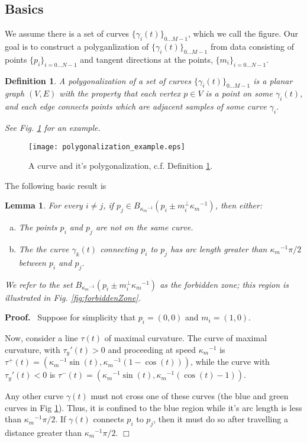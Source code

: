 \documentclass{article}
\newtheorem{definition}[cntr]{Definition}
\newenvironment{proof}{
  \noindent\textbf{Proof.}\ }{\hspace*{\fill}
  \begin{math}\Box\end{math}\medskip}
\newtheorem{lemma}[cntr]{Lemma}
\numberwithin{cntr}{section}
\numberwithin{equation}{section}
\newcommand{\Oto}[1]{{0 \ldots #1-1}}
\newcommand{\OtoN}{{0 \ldots N-1}}
\newcommand{\pointData}{{ \{ p_{i} \}_{i=\OtoN} }}
\newcommand{\tanData}{{ \{ m_{i} \}_{i=\OtoN} }}
\newcommand{\curveSet}{{ \{ \gamma_i(t) \}_{\Oto{M}}}}
\newcommand{\ball}[2]{ { B_{#1}(#2) } }
\newcommand{\kmax}{{\kappa_{m}}}
\newcommand{\kmaxi}{{\kmax^{-1}}}
\begin{document}
\subsection{Basics}

We assume there is a set of curves $\curveSet$, which we call the figure. Our goal is to construct a polyganlization of $\curveSet$ from data consisting of points $\pointData$ and tangent directions at the points, $\tanData$.

\begin{definition}
  \label{def:polygonalization}
  A polygonalization of a set of curves $\curveSet$ is a planar graph $(V,E)$ with the property that each vertex $p \in V$ is a point on some $\gamma_{i}(t)$, and each edge connects points which are adjacent samples of some curve $\gamma_{i}$.

  See Fig. \ref{fig:polygonalization} for an example.
\end{definition}

\begin{figure}
\setlength{\unitlength}{0.240900pt}
\ifx\plotpoint\undefined\newsavebox{\plotpoint}\fi
\sbox{\plotpoint}{\rule[-0.200pt]{0.400pt}{0.400pt}}%
\texttt{[image: polygonalization\_example.eps]}

\caption{A curve and it's polygonalization, c.f. Definition \ref{def:polygonalization}. }
\label{fig:polygonalization}
\end{figure}

The following basic result is
\begin{lemma}
  \label{lem:forbiddenZone}
  For every $i \neq j$, if $p_{j} \in \ball{\kmaxi}{p_{i} \pm m_{i}^{\perp} \kmaxi}$, then either:
  \begin{enumerate}[a.]
  \item The points $p_{i}$ and $p_{j}$ are not on the same curve.
  \item The the curve $\gamma_{k}(t)$ connecting $p_{i}$ to $p_{j}$ has arc length greater than $\kmaxi \pi/2$ between $p_{i}$ and $p_{j}$.
  \end{enumerate}
  We refer to the set $\ball{\kmaxi}{p_{i} \pm m_{i}^{\perp} \kmaxi}$ as the \emph{forbidden zone}; this region is illustrated in Fig. \ref{fig:forbiddenZone}.
\end{lemma}

\begin{proof}
  Suppose for simplicity that $p_{i}=(0,0)$ and $m_{i}=(1,0)$.

  Now, consider a line $\tau(t)$ of maximal curvature. The curve of maximal curvature, with $\tau_{y}'(t) > 0$ and proceeding at speed $\kmaxi$ is $\tau^{+}(t)=(\kmaxi \sin(t), \kmaxi (1-\cos(t)))$, while the curve with $\tau_{y}'(t) < 0$ is $\tau^{-}(t)=(\kmaxi \sin(t), \kmaxi (\cos(t)-1))$.

Any other curve $\gamma(t)$ must not cross one of these curves (the blue and green curves in Fig \ref{lem:forbiddenZone}). Thus, it is confined to the blue region while it's arc length is less than $\kmaxi \pi/2$. If $\gamma(t)$ connects $p_{i}$ to $p_{j}$, then it must do so after travelling a distance greater than $\kmaxi \pi/2$.
\end{proof}
\end{document}
